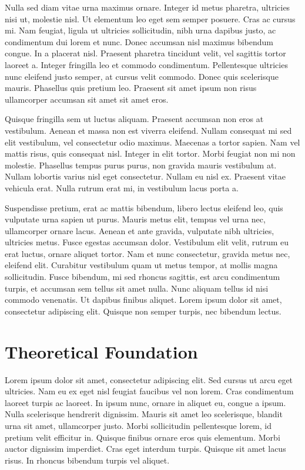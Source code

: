 \documentclass[a4paper,11pt]{kth-mag}
\begin{document}
Nulla sed diam vitae urna maximus ornare. Integer id metus pharetra, ultricies nisi ut, molestie nisl. Ut elementum leo eget sem semper posuere. Cras ac cursus mi. Nam feugiat, ligula ut ultricies sollicitudin, nibh urna dapibus justo, ac condimentum dui lorem et nunc. Donec accumsan nisl maximus bibendum congue. In a placerat nisl. Praesent pharetra tincidunt velit, vel sagittis tortor laoreet a. Integer fringilla leo et commodo condimentum. Pellentesque ultricies nunc eleifend justo semper, at cursus velit commodo. Donec quis scelerisque mauris. Phasellus quis pretium leo. Praesent sit amet ipsum non risus ullamcorper accumsan sit amet sit amet eros.

Quisque fringilla sem ut luctus aliquam. Praesent accumsan non eros at vestibulum. Aenean et massa non est viverra eleifend. Nullam consequat mi sed elit vestibulum, vel consectetur odio maximus. Maecenas a tortor sapien. Nam vel mattis risus, quis consequat nisl. Integer in elit tortor. Morbi feugiat non mi non molestie. Phasellus tempus purus purus, non gravida mauris vestibulum at. Nullam lobortis varius nisl eget consectetur. Nullam eu nisl ex. Praesent vitae vehicula erat. Nulla rutrum erat mi, in vestibulum lacus porta a.

Suspendisse pretium, erat ac mattis bibendum, libero lectus eleifend leo, quis vulputate urna sapien ut purus. Mauris metus elit, tempus vel urna nec, ullamcorper ornare lacus. Aenean et ante gravida, vulputate nibh ultricies, ultricies metus. Fusce egestas accumsan dolor. Vestibulum elit velit, rutrum eu erat luctus, ornare aliquet tortor. Nam et nunc consectetur, gravida metus nec, eleifend elit. Curabitur vestibulum quam ut metus tempor, at mollis magna sollicitudin. Fusce bibendum, mi sed rhoncus sagittis, est arcu condimentum turpis, et accumsan sem tellus sit amet nulla. Nunc aliquam tellus id nisi commodo venenatis. Ut dapibus finibus aliquet. Lorem ipsum dolor sit amet, consectetur adipiscing elit. Quisque non semper turpis, nec bibendum lectus.

\chapter{Theoretical Foundation}

Lorem ipsum dolor sit amet, consectetur adipiscing elit. Sed cursus ut arcu eget ultricies. Nam eu ex eget nisl feugiat faucibus vel non lorem. Cras condimentum laoreet turpis ac laoreet. In ipsum nunc, ornare in aliquet eu, congue a ipsum. Nulla scelerisque hendrerit dignissim. Mauris sit amet leo scelerisque, blandit urna sit amet, ullamcorper justo. Morbi sollicitudin pellentesque lorem, id pretium velit efficitur in. Quisque finibus ornare eros quis elementum. Morbi auctor dignissim imperdiet. Cras eget interdum turpis. Quisque sit amet lacus risus. In rhoncus bibendum turpis vel aliquet.
\end{document}
